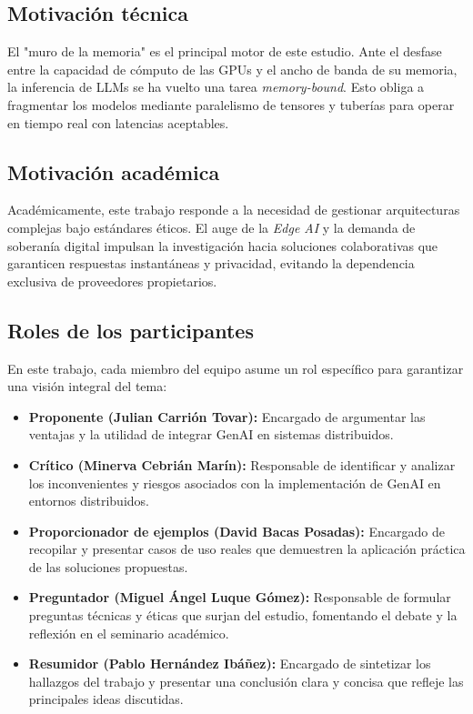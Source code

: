 \documentclass[runningheads]{llncs}
\begin{document}
\subsection{Motivación técnica}
El "muro de la memoria" es el principal motor de este estudio. Ante el desfase entre la capacidad de cómputo de las GPUs y el ancho de banda de su memoria, la inferencia de LLMs se ha vuelto una tarea \textit{memory-bound}. Esto obliga a fragmentar los modelos mediante paralelismo de tensores y tuberías para operar en tiempo real con latencias aceptables.

\subsection{Motivación académica}
Académicamente, este trabajo responde a la necesidad de gestionar arquitecturas complejas bajo estándares éticos. El auge de la \textit{Edge AI} y la demanda de soberanía digital impulsan la investigación hacia soluciones colaborativas que garanticen respuestas instantáneas y privacidad, evitando la dependencia exclusiva de proveedores propietarios.

\subsection{Roles de los participantes}
En este trabajo, cada miembro del equipo asume un rol específico para garantizar una visión integral del tema:
\begin{itemize}
    \item \textbf{Proponente (Julian Carrión Tovar):} Encargado de argumentar las ventajas y la utilidad de integrar GenAI en sistemas distribuidos.
    \item \textbf{Crítico (Minerva Cebrián Marín):} Responsable de identificar y analizar los inconvenientes y riesgos asociados con la implementación de GenAI en entornos distribuidos.
    \item \textbf{Proporcionador de ejemplos (David Bacas Posadas):} Encargado de recopilar y presentar casos de uso reales que demuestren la aplicación práctica de las soluciones propuestas.
    \item \textbf{Preguntador (Miguel Ángel Luque Gómez):} Responsable de formular preguntas técnicas y éticas que surjan del estudio, fomentando el debate y la reflexión en el seminario académico.
    \item \textbf{Resumidor (Pablo Hernández Ibáñez):} Encargado de sintetizar los hallazgos del trabajo y presentar una conclusión clara y concisa que refleje las principales ideas discutidas.
\end{itemize}
\end{document}
